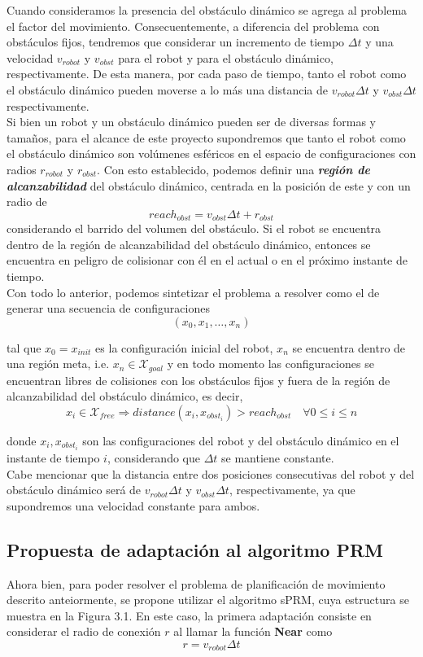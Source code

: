 \documentclass[spanish,mexico]{article}
\numberwithin{equation}{section}
\theoremstyle{definition}
\theoremstyle{remark}
\begin{document}
Cuando consideramos la presencia del obstáculo dinámico se agrega al problema el factor del movimiento. Consecuentemente, a diferencia del problema con obstáculos fijos, tendremos que considerar un incremento de tiempo $\Delta t$ y una velocidad $v_{robot}$ y $v_{obst}$ para el robot y para el obstáculo dinámico, respectivamente. De esta manera, por cada paso de tiempo, tanto el robot como el obstáculo dinámico pueden moverse a lo más una distancia de $v_{robot}\Delta t$ y $v_{obst}\Delta t$ respectivamente.\\

Si bien un robot y un obstáculo dinámico pueden ser de diversas formas y tamaños, para el alcance de este proyecto supondremos que tanto el robot como el obstáculo dinámico son volúmenes esféricos en el espacio de configuraciones con radios $r_{robot}$ y $r_{obst}$. Con esto establecido, podemos definir una \textit{\textbf{región de alcanzabilidad}} del obstáculo dinámico, centrada en la posición de este y con un radio de 
$$reach_{obst} = v_{obst}\Delta t + r_{obst}$$ 
considerando el barrido del volumen del obstáculo. Si el robot se encuentra dentro de la región de alcanzabilidad del obstáculo dinámico, entonces se encuentra en peligro de colisionar con él en el actual o en el próximo instante de tiempo.\\

Con todo lo anterior, podemos sintetizar el problema a resolver como el de generar una secuencia de configuraciones 
$$(x_0, x_1, \dots, x_n)$$

tal que $x_0 = x_{init}$ es la configuración inicial del robot, $x_n$ se encuentra dentro de una región meta, i.e. $x_n \in \mathcal{X}_{goal}$  y en todo momento las configuraciones se encuentran libres de colisiones con los obstáculos fijos y fuera de la región de alcanzabilidad del obstáculo dinámico, es decir, 
$$x_i \in \mathcal{X}_{free} \Rightarrow distance(x_i, x_{obst_i}) > reach_{obst} \quad \forall 0\leq i \leq n$$

donde $x_i, x_{obst_i}$ son las configuraciones del robot y del obstáculo dinámico en el instante de tiempo $i$, considerando que $\Delta t$ se mantiene constante.\\

Cabe mencionar que la distancia entre dos posiciones consecutivas del robot y del obstáculo dinámico será de $v_{robot}\Delta t$ y $v_{obst}\Delta t$, respectivamente, ya que supondremos una velocidad constante para ambos. 

\subsection{Propuesta de adaptación al algoritmo PRM}
Ahora bien, para poder resolver el problema de planificación de movimiento descrito anteiormente, se propone utilizar el algoritmo sPRM, cuya estructura se muestra en la Figura 3.1. En este caso, la primera adaptación consiste en considerar el radio de conexión $r$ al llamar la función \textbf{Near} como 
$$r = v_{robot}\Delta t$$
\end{document}
